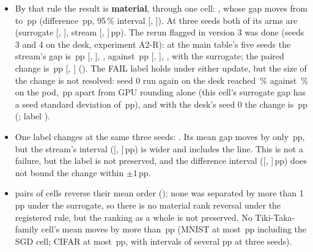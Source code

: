 \begin{itemize}
\item By that rule the result is \textbf{material}, through one cell: \RXFidMaterialList, whose gap moves from
      \RXFidMnistEcramMoKimTwoZeroOneNineSgdSur{} to \RXFidMnistEcramMoKimTwoZeroOneNineSgdSeq\,pp
      (difference \RXFidMnistEcramMoKimTwoZeroOneNineSgdD\,pp, 95\,\% interval [\RXFidMnistEcramMoKimTwoZeroOneNineSgdLo,
      \RXFidMnistEcramMoKimTwoZeroOneNineSgdHi]). At three seeds both of its arms are
      \RYFidMnistEcramMoKimTwoZeroOneNineSgdSurLabel{} (surrogate [\RYFidMnistEcramMoKimTwoZeroOneNineSgdSurLo,
      \RYFidMnistEcramMoKimTwoZeroOneNineSgdSurHi], stream [\RYFidMnistEcramMoKimTwoZeroOneNineSgdSeqLo,
      \RYFidMnistEcramMoKimTwoZeroOneNineSgdSeqHi]\,pp). The rerun flagged in version 3 was done (seeds 3 and 4 on the desk,
      experiment A2-R): at the main table's five seeds the stream's gap is \RYAtwoRSeqGap\,pp [\RYAtwoRSeqLo, \RYAtwoRSeqHi],
      \RYAtwoRSeqLabel, against \RYAtwoRSurGap\,pp [\RYAtwoRSurLo, \RYAtwoRSurHi], \RYAtwoRSurLabel, with the surrogate; the
      paired change is \RYAtwoRD\,pp [\RYAtwoRDLo, \RYAtwoRDHi] (\RYAtwoRMaterial). The FAIL label holds under either update,
      but the size of the change is not resolved: seed 0 run again on the desk reached \RYAtwoRSeedZeroDesk\,\% against
      \RYAtwoRSeedZeroPod\,\% on the pod, \RYAtwoRSeedZeroDiff\,pp apart from GPU rounding alone (this cell's surrogate gap has
      a seed standard deviation of \RYAtwoRSurSd\,pp), and with the desk's seed 0 the change is \RYAtwoRAltD\,pp
      (\RYAtwoRAltMaterial; label \RYAtwoRAltLabel).
\item One label changes at the same three seeds: \RYFidTransList. Its mean gap moves by only
      \RXFidCifarEcramLiTangTwoZeroOneEightCttvTwoD\,pp, but the stream's interval
      ([\RYFidCifarEcramLiTangTwoZeroOneEightCttvTwoSeqLo, \RYFidCifarEcramLiTangTwoZeroOneEightCttvTwoSeqHi]\,pp) is wider and
      includes the line. This is not a failure, but the label is not preserved, and the difference interval
      ([\RXFidCifarEcramLiTangTwoZeroOneEightCttvTwoLo, \RXFidCifarEcramLiTangTwoZeroOneEightCttvTwoHi]\,pp) does not bound
      the change within $\pm1$\,pp.
\item \RYFidRevN{} pairs of cells reverse their mean order (\RYFidRevList); none was separated by more than 1\,pp under the
      surrogate, so there is no material rank reversal under the registered rule, but the ranking as a whole is not preserved.
      No Tiki-Taka-family cell's mean moves by more than \RXFidTtMaxAbs\,pp (MNIST at most \RXFidMnistMaxAbs\,pp including the
      SGD cell; CIFAR at most \RXFidCifarMaxAbs\,pp, with intervals of several pp at three seeds).
\end{itemize}
